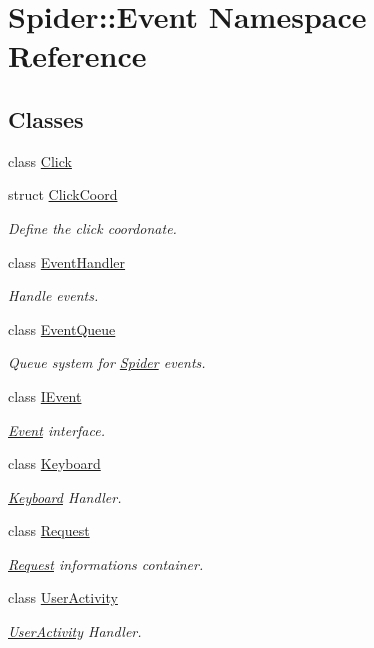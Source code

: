 \hypertarget{namespace_spider_1_1_event}{}\section{Spider\+:\+:Event Namespace Reference}
\label{namespace_spider_1_1_event}
\subsection*{Classes}
\begin{DoxyCompactItemize}
\item 
class \hyperlink{class_spider_1_1_event_1_1_click}{Click}
\item 
struct \hyperlink{struct_spider_1_1_event_1_1_click_coord}{Click\+Coord}
\begin{DoxyCompactList}\small\item\em Define the click coordonate. \end{DoxyCompactList}\item 
class \hyperlink{class_spider_1_1_event_1_1_event_handler}{Event\+Handler}
\begin{DoxyCompactList}\small\item\em Handle events. \end{DoxyCompactList}\item 
class \hyperlink{class_spider_1_1_event_1_1_event_queue}{Event\+Queue}
\begin{DoxyCompactList}\small\item\em Queue system for \hyperlink{namespace_spider}{Spider} events. \end{DoxyCompactList}\item 
class \hyperlink{class_spider_1_1_event_1_1_i_event}{I\+Event}
\begin{DoxyCompactList}\small\item\em \hyperlink{namespace_spider_1_1_event}{Event} interface. \end{DoxyCompactList}\item 
class \hyperlink{class_spider_1_1_event_1_1_keyboard}{Keyboard}
\begin{DoxyCompactList}\small\item\em \hyperlink{class_spider_1_1_event_1_1_keyboard}{Keyboard} Handler. \end{DoxyCompactList}\item 
class \hyperlink{class_spider_1_1_event_1_1_request}{Request}
\begin{DoxyCompactList}\small\item\em \hyperlink{class_spider_1_1_event_1_1_request}{Request} informations container. \end{DoxyCompactList}\item 
class \hyperlink{class_spider_1_1_event_1_1_user_activity}{User\+Activity}
\begin{DoxyCompactList}\small\item\em \hyperlink{class_spider_1_1_event_1_1_user_activity}{User\+Activity} Handler. \end{DoxyCompactList}\end{DoxyCompactItemize}
